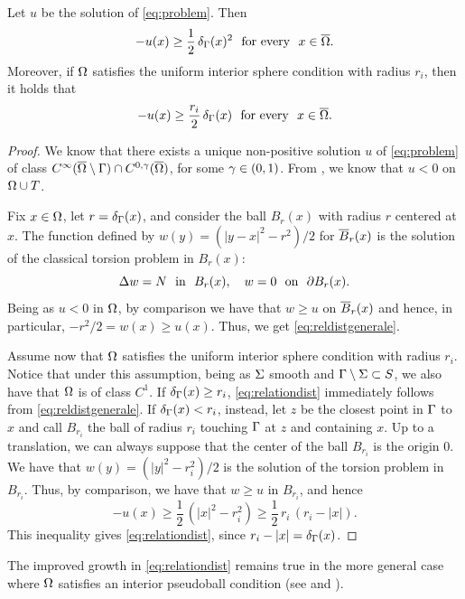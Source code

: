 \documentclass[a4paper,10pt]{amsart}
\numberwithin{equation}{section}
\begin{document}
\begin{lem}
	\label{lem:relationdist}
Let $u$ be the solution of \eqref{eq:problem}. Then
	\begin{equation}
\label{eq:reldistgenerale}
		-u(x)\ge\frac12\,\delta_{\Gamma}(x)^2 \ \mbox{ for every } \ x\in\overline{\Omega}.
	\end{equation}
	Moreover, if $\Omega$ satisfies the uniform interior sphere condition with radius $r_i$, then it holds that
	\begin{equation}
		\label{eq:relationdist}
		-u(x) \ge \frac{r_i}{2}\,\delta_{\Gamma} (x)  \ \mbox{ for every } \ x\in\overline{\Omega}.
	\end{equation}
\end{lem}

\begin{proof}
	We know that there exists a unique non-positive solution $u$ of \eqref{eq:problem} of class  $C^\infty ( \overline{\Omega} \setminus \Gamma) \cap C^{0, \gamma} (\overline{\Omega})$, for some $\gamma \in (0,1)$. From \cite[Proposition 2.3]{GX}, we know that $u<0$ on $\Omega\cup T$. 
\par
Fix $x\in\Omega$, let $r=\delta_{\Gamma} (x)$, and consider the ball $B_r(x)$ with radius $r$ centered at $x$. 
The function defined by $w(y)=(|y-x|^2-r^2)/2$ for $\overline{B}_r(x)$ is the solution of the classical torsion problem in $B_r(x)$:
	\begin{equation*}
		\Delta w =N  \ \text{  in } \ B_r(x), \quad w =0 \ \text{  on } \ \partial B_r(x).
	\end{equation*}
Being as $u<0$ in $\Omega$, by comparison we have that $w\ge u$ on $\overline{B}_r(x)$ and hence, in particular, $-r^2/2=w(x) \ge u(x)$. Thus, we get \eqref{eq:reldistgenerale}.
	\par
	Assume now that $\Omega$ satisfies the uniform interior sphere condition with radius $r_i$. Notice that under this assumption, being as $\Sigma$ smooth and $\Gamma \setminus \Sigma \subset S$, we also have that $\Omega$ is of class $C^1$. If $\delta_{\Gamma}(x)\ge r_i$, \eqref{eq:relationdist} immediately follows from \eqref{eq:reldistgenerale}. If $\delta_{\Gamma } (x) < r_i$, instead, let $z$ be the closest point in $\Gamma$ to $x$ and call $B_{r_i}$ the ball of radius $r_i$ touching $\Gamma$ at $z$ and containing $x$. Up to a translation, we can always suppose that the center of the ball $B_{r_i}$ is the origin $0$. We have that $w(y)=\left(|y|^2- r_i^2 \right)/2$ is the solution of the torsion problem in $B_{r_i}$. Thus, by comparison, we have that $w \ge u$ in $B_{r_i}$, and hence
	$$
	-u(x) \ge \frac12\,(|x|^2-r_i^2)\ge\frac12\,r_i\,(r_i-|x|).
	$$
	This inequality gives \eqref{eq:relationdist}, since $r_i-|x|=\delta_{\Gamma } (x)$.
\end{proof}
\begin{rem}
	{\rm The improved growth in \eqref{eq:relationdist} remains true in the more general case where $\Omega$ satisfies an interior pseudoball condition (see \cite[Step 2 in the proof of Theorem I]{CPY} and \cite[Theorem 4.4]{ABMMZ}).
	}
\end{rem}
\end{document}
